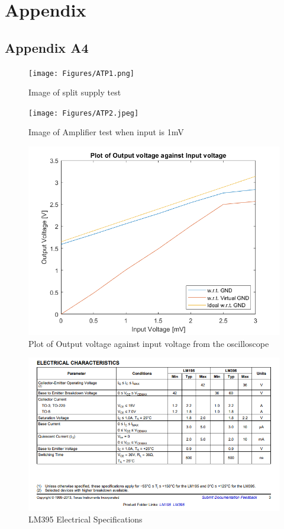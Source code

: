 \documentclass[class=report,11pt,crop=false]{standalone}
\begin{document}
	\chapter{Appendix}
	\section{Appendix A4}
	\begin{figure}[h!]
		\centering
		\texttt{[image: Figures/ATP1.png]}
		\caption{Image of split supply test}
		\label{fig:S7}
	\end{figure}
	\begin{figure}[h!]
		\centering
		\texttt{[image: Figures/ATP2.jpeg]}
		\caption{Image of Amplifier test when input is 1mV}
		\label{fig:S8}
	\end{figure}
	\begin{figure}[h!]
		\centering
		\includegraphics[width=0.4\linewidth]{Figures/Result1.png}
		\caption{Plot of Output voltage against input voltage from the oscilloscope}
		\label{fig:S11}
	\end{figure}
		\begin{figure}[h!]
		\centering
		\includegraphics[width=0.4\linewidth]{Figures/LM395 SPECS.png}
		\caption{LM395 Electrical Specifications}
		\label{fig:P5}
	\end{figure}
	\ifstandalone
	
	\printnoidxglossary[type=\acronymtype,nonumberlist]
	\fi
\end{document}
